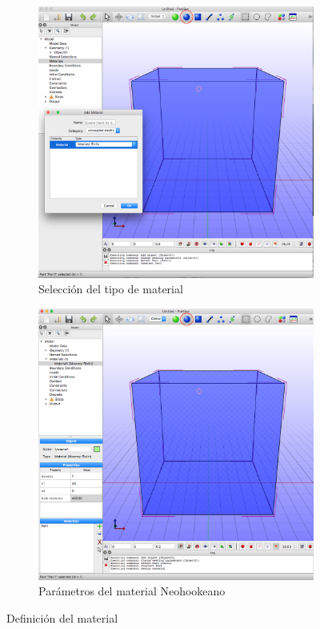 \begin{figure}[!htpb]
\centering
\begin{subfigure}[b]{0.48\textwidth}
\includegraphics[width=\textwidth]{figuras_3/scr-pre-04m.png}
\caption{Selección del tipo de material}
\label{fig:pre-04}
\end{subfigure}
\begin{subfigure}[b]{0.48\textwidth}
\includegraphics[width=\textwidth]{figuras_3/scr-pre-05m.png}
\caption{Parámetros del material Neohookeano}
\label{fig:pre-05}
\end{subfigure}
\caption{Definición del material}
\label{fig:pre-04-05}
\end{figure}

